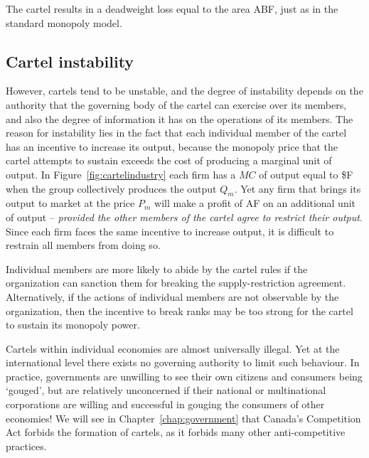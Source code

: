 

The cartel results in a deadweight loss equal to the area ABF, just as in the standard monopoly model.

\subsection*{Cartel instability}

However, cartels tend to be unstable, and the degree of instability depends on the authority that the governing body of the cartel can exercise over its members, and also the degree of information it has on the operations of its members. The reason for instability lies in the fact that each individual member of the cartel has an incentive to increase its output, because the monopoly price that the cartel attempts to sustain exceeds the cost of producing a marginal unit of output. In Figure~\ref{fig:cartelindustry} each firm has a $MC$ of output equal to \$F when the group collectively produces the output $Q_m$. Yet any firm that brings its output to market at the price $P_m$ will make a profit of AF on an additional unit of output -- \textit{provided the other members of the cartel agree to restrict their output}. Since each firm faces the same incentive to increase output, it is difficult to restrain all members from doing so.

Individual members are more likely to abide by the cartel rules if the organization can sanction them for breaking the supply-restriction agreement. Alternatively, if the actions of individual members are not observable by the organization, then the incentive to break ranks may be too strong for the cartel to sustain its monopoly power. 

Cartels within individual economies are almost universally illegal. Yet at the international level there exists no governing authority to limit such behaviour. In practice, governments are unwilling to see their own citizens and consumers being `gouged', but are relatively unconcerned if their national or multinational corporations are willing and successful in gouging the consumers of other economies! We will see in Chapter~\ref{chap:government} that Canada's Competition Act forbids the formation of cartels, as it forbids many other anti-competitive practices.

